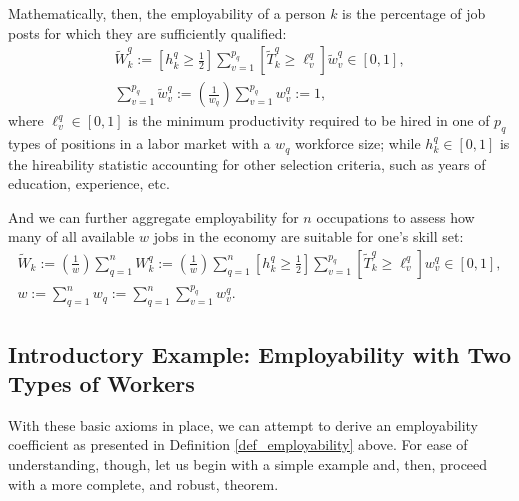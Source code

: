 \documentclass[hidelinks, nonatbib]{elsarticle}
\begin{document}
\begin{definition}[Employability]
    \label{def_employability}
    Mathematically, then, the employability of a person $k$ is the percentage of job posts for which they are sufficiently qualified:
    \begin{gather}
    \tilde{W}_{k}^{q}
    :=
    \left[
        h_{k}^{q}
        \geq
        \frac{1}{2}
    \right]
    \sum_{v=1}^{p_q}
    \left[
        \tilde{T}_{k}^{q}
        \geq
        \ell_{v}^{q}
    \right]
    \tilde{w}_{v}^{q}
    \in
    [0,1]
    ,
    \\
    \sum_{v=1}^{p_q}
    \tilde{w}_{v}^{q}
    :=
    \left(
        \frac{1}{w_q}
    \right)
    \sum_{v=1}^{p_q}
    w_{v}^{q}
    := 1
    ,
    \end{gather}
    where $\ell_{v}^{q} \in [0,1]$ is the minimum productivity required to be hired in one of $p_q$ types of positions in a labor market with a $w_q$ workforce size; while $h_{k}^{q} \in [0,1]$ is the hireability statistic accounting for other selection criteria, such as years of education, experience, etc.
    
    And we can further aggregate employability for $n$ occupations to assess how many of all available $w$ jobs in the economy are suitable for one's skill set:
    \begin{gather}
    \tilde{W}_{k}
    :=
    \left(
        \frac{1}{w}
    \right)
    \sum_{q=1}^{n}
    W_{k}^{q}
    :=
    \left(
        \frac{1}{w}
    \right)
    \sum_{q=1}^{n}
    \left[
        h_{k}^{q}
        \geq
        \frac{1}{2}
    \right]
    \sum_{v=1}^{p_q}
    \left[
        \tilde{T}_{k}^{q}
        \geq
        \ell_{v}^{q}
    \right]
    w_{v}^{q}
    \in
    [0,1]
    ,
    \\
    w
    :=
    \sum_{q=1}^{n}
    w_{q}
    :=
    \sum_{q=1}^{n}
    \sum_{v=1}^{p_q}
    w_{v}^{q}
    .
    \end{gather}
\end{definition}

\subsection{Introductory Example: Employability with Two Types of Workers}
With these basic axioms in place, we can attempt to derive an employability coefficient as presented in Definition \ref{def_employability} above. For ease of understanding, though, let us begin with a simple example and, then, proceed with a more complete, and robust, theorem.
\end{document}
